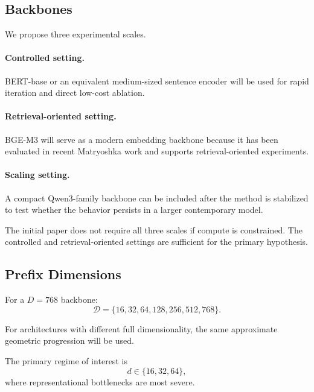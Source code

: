 \documentclass[11pt]{article}
\begin{document}
\subsection{Backbones}

We propose three experimental scales.

\paragraph{Controlled setting.}
BERT-base or an equivalent medium-sized sentence encoder will be used for rapid iteration and direct low-cost ablation.

\paragraph{Retrieval-oriented setting.}
BGE-M3 will serve as a modern embedding backbone because it has been evaluated in recent Matryoshka work and supports retrieval-oriented experiments.

\paragraph{Scaling setting.}
A compact Qwen3-family backbone can be included after the method is stabilized to test whether the behavior persists in a larger contemporary model.

The initial paper does not require all three scales if compute is constrained.
The controlled and retrieval-oriented settings are sufficient for the primary hypothesis.


\subsection{Prefix Dimensions}

For a $D=768$ backbone:
\begin{equation}
    \mathcal D
    =
    \{
        16,32,64,128,256,512,768
    \}.
\end{equation}

For architectures with different full dimensionality, the same approximate geometric progression will be used.

The primary regime of interest is
\begin{equation}
    d\in\{16,32,64\},
\end{equation}
where representational bottlenecks are most severe.
\end{document}
